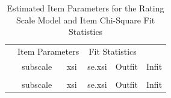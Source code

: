 \documentclass[
  letterpaper,
]{article}
\begin{document}
\begin{longtable}[t]{>{\raggedright\arraybackslash}p{11cm}ccccc}

\caption{\label{tbl-RSM-item-tbl}Estimated Item Parameters for the
Rating Scale Model and Item Chi-Square Fit Statistics}

\tabularnewline

\toprule
\multicolumn{2}{c}{ } & \multicolumn{2}{c}{Item Parameters} & \multicolumn{2}{c}{Fit Statistics} \\
\cmidrule(l{3pt}r{3pt}){3-4} \cmidrule(l{3pt}r{3pt}){5-6}
  & subscale & xsi & se.xsi & Outfit & Infit\\
\midrule
\endfirsthead
\multicolumn{6}{@{}l}{\textit{(continued)}}\\
\toprule
  & subscale & xsi & se.xsi & Outfit & Infit\\
\midrule
\endhead


\end{longtable}
\end{document}

